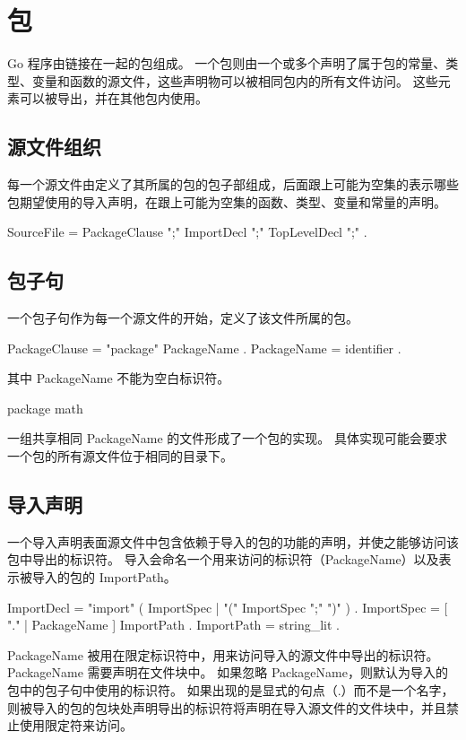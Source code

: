 \chapter{包}
Go 程序由链接在一起的包组成。
一个包则由一个或多个声明了属于包的常量、类型、变量和函数的源文件，这些声明物可以被相同包内的所有文件访问。
这些元素可以被导出，并在其他包内使用。

\section{源文件组织}
每一个源文件由定义了其所属的包的包子部组成，后面跟上可能为空集的表示哪些包期望使用的导入声明，在跟上可能为空集的函数、类型、变量和常量的声明。
\begin{EBNF}
SourceFile       = PackageClause ";" { ImportDecl ";" } { TopLevelDecl ";" } .
\end{EBNF}

\section{包子句}
一个包子句作为每一个源文件的开始，定义了该文件所属的包。
\begin{EBNF}
PackageClause  = "package" PackageName .
PackageName    = identifier .
\end{EBNF}
其中 PackageName 不能为空白标识符。
\begin{golang}
package math
\end{golang}

一组共享相同 PackageName 的文件形成了一个包的实现。
具体实现可能会要求一个包的所有源文件位于相同的目录下。

\section{导入声明}
一个导入声明表面源文件中包含依赖于导入的包的功能的声明，并使之能够访问该包中导出的标识符。
导入会命名一个用来访问的标识符（PackageName）以及表示被导入的包的 ImportPath。
\begin{EBNF}
ImportDecl       = "import" ( ImportSpec | "(" { ImportSpec ";" } ")" ) .
ImportSpec       = [ "." | PackageName ] ImportPath .
ImportPath       = string_lit .
\end{EBNF}

PackageName 被用在限定标识符中，用来访问导入的源文件中导出的标识符。
PackageName 需要声明在文件块中。
如果忽略 PackageName，则默认为导入的包中的包子句中使用的标识符。
如果出现的是显式的句点（.）而不是一个名字，则被导入的包的包块处声明导出的标识符将声明在导入源文件的文件块中，并且禁止使用限定符来访问。

